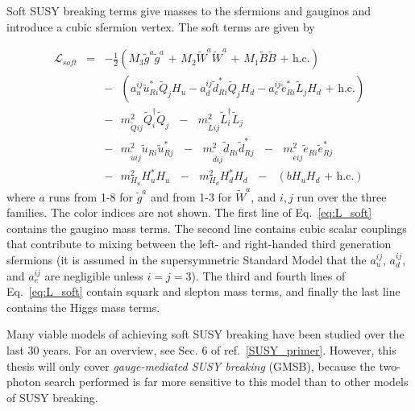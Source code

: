 \documentclass[dissertation.tex]{subfiles}
\begin{document}
Soft SUSY breaking terms give masses to the sfermions and gauginos and introduce a cubic sfermion vertex.  The soft terms are given by

\begin{eqnarray}
\label{eq:L_soft}
\mathcal{L}_{soft} &=& -\frac{1}{2}(M_{3}\widetilde{g}^{a}\widetilde{g}^{a}\mbox{ + }M_{2}\widetilde{W}^{a}\widetilde{W}^{a}\mbox{ + }M_{1}\widetilde{B}\widetilde{B}\mbox{ + h.c.})\nonumber \\
&&-\mbox{ }(a_{u}^{ij}\widetilde{u}_{Ri}^{*}\widetilde{Q}_{j}H_{u} - a_{d}^{ij}\widetilde{d}_{Ri}^{*}\widetilde{Q}_{j}H_{d} - a_{e}^{ij}\widetilde{e}_{Ri}^{*}\widetilde{L}_{j}H_{d}\mbox{ + h.c.})\nonumber \\
&&-\mbox{ }m_{\widetilde{Q}ij}^{2}\widetilde{Q}_{i}^{\dag}\widetilde{Q}_{j}\mbox{ }-\mbox{ }m_{\widetilde{L}ij}^{2}\widetilde{L}_{i}^{\dag}\widetilde{L}_{j}\mbox{ }\nonumber \\
&&-\mbox{ }m_{\widetilde{\overline{u}}ij}^{2}\widetilde{u}_{Ri}\widetilde{u}_{Rj}^{*}\mbox{ }-\mbox{ }m_{\widetilde{\overline{d}}ij}^{2}\widetilde{d}_{Ri}\widetilde{d}_{Rj}^{*}\mbox{ }-\mbox{ }m_{\widetilde{\overline{e}}ij}^{2}\widetilde{e}_{Ri}\widetilde{e}_{Rj}^{*}\mbox{ }\nonumber \\
&&-\mbox{ }m_{H_{u}}^{2}H_{u}^{*}H_{u}\mbox{ }-\mbox{ }m_{H_{d}}^{2}H_{d}^{*}H_{d}\mbox{ }-\mbox{ }(bH_{u}H_{d}\mbox{ + h.c.})
\end{eqnarray}
where $a$ runs from 1-8 for $\widetilde{g}^{a}$ and from 1-3 for $\widetilde{W}^{a}$, and $i,j$ run over the three families.  The color indices are not shown.  The first line of Eq.~\ref{eq:L_soft} contains the gaugino mass terms.  The second line contains cubic scalar couplings that contribute to mixing between the left- and right-handed third generation sfermions (it is assumed in the supersymmetric Standard Model that the $a_{u}^{ij}$, $a_{d}^{ij}$, and $a_{e}^{ij}$ are negligible unless $i = j = 3$).  The third and fourth lines of Eq.~\ref{eq:L_soft} contain squark and slepton mass terms, and finally the last line contains the Higgs mass terms.

Many viable models of achieving soft SUSY breaking have been studied over the last 30 years.  For an overview, see Sec. 6 of ref.~\ref{SUSY_primer}.  However, this thesis will only cover \textit{gauge-mediated SUSY breaking} (GMSB), because the two-photon search performed is far more sensitive to this model than to other models of SUSY breaking.
\end{document}
